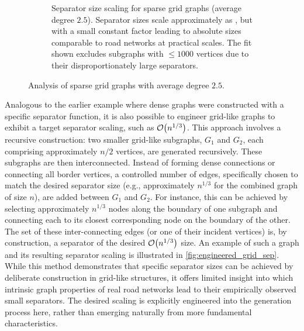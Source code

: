 \begin{figure}[tbhp]
\begin{subfigure}{0.55\linewidth}
		\caption{Separator size scaling for sparse grid graphs (average degree \(2.5\)). Separator sizes scale approximately as , but with a small constant factor leading to absolute sizes comparable to road networks at practical scales. The fit shown excludes subgraphs with \( \le 1000 \) vertices due to their disproportionately large separators.}
		\label{fig:sparse_grid_sep_plot}
	\end{subfigure}
	\caption{Analysis of sparse grid graphs with average degree \(2.5\).}
	\label{fig:sparse_grid_separators}
\end{figure}


Analogous to the earlier example where dense graphs were constructed with a specific separator function, it is also possible to engineer grid-like graphs to exhibit a target separator scaling, such as \(\mathcal{O}\!\left(n^{1/3}\right)\).
This approach involves a recursive construction: two smaller grid-like subgraphs, \(G_1\) and \(G_2\), each comprising approximately \(n/2\) vertices, are generated recursively.
These subgraphs are then interconnected.
Instead of forming dense connections or connecting all border vertices, a controlled number of edges, specifically chosen to match the desired separator size (e.g., approximately \(n^{1/3}\) for the combined graph of size \(n\)), are added between \(G_1\) and \(G_2\).
For instance, this can be achieved by selecting approximately \(n^{1/3}\) nodes along the boundary of one subgraph and connecting each to its closest corresponding node on the boundary of the other.
The set of these inter-connecting edges (or one of their incident vertices) is, by construction, a separator of the desired \(\mathcal{O}\!\left(n^{1/3}\right)\) size.
An example of such a graph and its resulting separator scaling is illustrated in \cref{fig:engineered_grid_sep}.
While this method demonstrates that specific separator sizes can be achieved by deliberate construction in grid-like structures, it offers limited insight into which intrinsic graph properties of real road networks lead to their empirically observed small separators.
The desired scaling is explicitly engineered into the generation process here, rather than emerging naturally from more fundamental characteristics.

